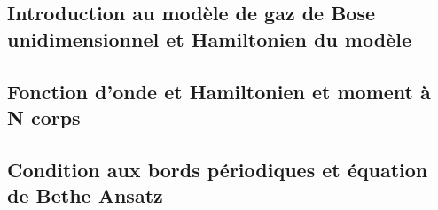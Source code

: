 \subsection{Introduction au modèle de gaz de Bose unidimensionnel et Hamiltonien du modèle}
%



%


%
 
\subsection{Fonction d’onde et Hamiltonien et moment à N corps}
%





%

%

%



%

\subsection{Condition aux bords périodiques et équation de Bethe Ansatz}